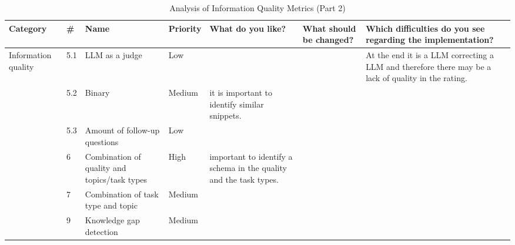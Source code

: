 \documentclass[
	english,
	ruledheaders=section,%
	class=report,%
	thesis={type=bachelor},%
	accentcolor=1b,%
	custommargins=true,%
	marginpar=false,%
	parskip=half-,%
	fontsize=11pt,%
	DIV=14,
]{tudapub}
\begin{document}
\begin{table}
    \centering
    \small 
    \caption{Analysis of Information Quality Metrics (Part 2)}
    \label{tab:info_quality_p2}
    \begin{tabularx}{\textheight}{p{2.2cm} l >{\RaggedRight\arraybackslash}X l >{\RaggedRight\arraybackslash}X >{\RaggedRight\arraybackslash}X >{\RaggedRight\arraybackslash}X}
        \toprule
        \textbf{Category} & \textbf{\#} & \textbf{Name} & \textbf{Priority} & \textbf{What do you like?} & \textbf{What should be changed?} & \textbf{Which difficulties do you see regarding the implementation?} \\
        \midrule
        \multirow{6}{=}{Information quality} 
        & 5.1 & LLM as a judge & Low & & & At the end it is a LLM correcting a LLM and therefore there may be a lack of quality in the rating. \\
        \cmidrule(l){2-7}
        & 5.2 & Binary & Medium & it is important to identify similar snippets. & & \\
        \cmidrule(l){2-7}
        & 5.3 & Amount of follow-up questions & Low & & & \\
        \cmidrule(l){2-7}
        & 6 & Combination of quality and topics/task types & High & important to identify a schema in the quality and the task types. & & \\
        \cmidrule(l){2-7}
        & 7 & Combination of task type and topic & Medium & & & \\
        \cmidrule(l){2-7}
        & 9 & Knowledge gap detection & Medium & & & \\
        \bottomrule
    \end{tabularx}
\end{table}
\end{document}
